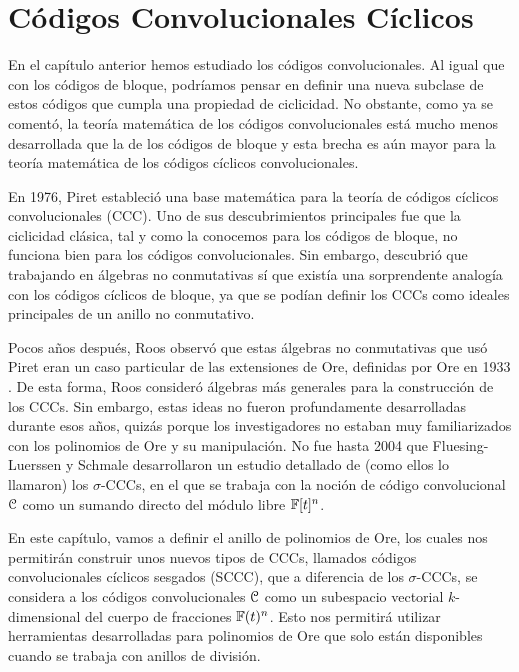 

\chapter{Códigos Convolucionales Cíclicos}\label{ch:cuarto-capitulo}

En el capítulo anterior hemos estudiado los códigos convolucionales. Al igual que con los códigos de bloque, podríamos pensar en definir una nueva subclase de estos códigos que cumpla una propiedad de ciclicidad. No obstante, como ya se comentó, la teoría matemática de los códigos convolucionales está mucho menos desarrollada que la de los códigos de bloque y esta brecha es aún mayor para la teoría matemática de los códigos cíclicos convolucionales.

En 1976, Piret \cite{Piret}  estableció una base matemática  para la teoría de códigos cíclicos convolucionales (CCC). Uno de sus descubrimientos principales fue que la ciclicidad clásica, tal y como la conocemos para los códigos de bloque, no funciona bien para los códigos convolucionales. Sin embargo, descubrió que trabajando en álgebras no conmutativas sí que existía una sorprendente analogía con los códigos cíclicos de bloque, ya que se podían definir los CCCs como ideales principales de un anillo no conmutativo.

Pocos años después, Roos \cite{Roos} observó que estas álgebras no conmutativas que usó Piret eran un caso particular de las extensiones de Ore, definidas por Ore en 1933 \cite{ore1933}. De esta forma, Roos consideró álgebras más generales para la construcción de los CCCs. Sin embargo, estas ideas no fueron profundamente desarrolladas durante esos años, quizás porque los investigadores no estaban muy familiarizados con los polinomios de Ore y su manipulación. No fue hasta 2004 que Fluesing-Luerssen y Schmale \cite{GL2004} desarrollaron un estudio detallado de (como ellos lo llamaron) los $\sigma$-CCCs, en el que se trabaja con la noción de código convolucional $\mathcal C$ como un sumando directo del módulo libre $\mathbb{F}[t]^n$.

En este capítulo, vamos a definir el anillo de polinomios de Ore, los cuales nos permitirán construir unos nuevos tipos de CCCs, llamados códigos convolucionales cíclicos sesgados (SCCC), que a diferencia de los $\sigma$-CCCs, se considera a los códigos convolucionales $\mathcal C$ como un subespacio vectorial $k$-dimensional del cuerpo de fracciones $\mathbb{F}(t)^n$. Esto nos permitirá utilizar herramientas desarrolladas para polinomios de Ore que solo están disponibles cuando se trabaja con anillos de división.

